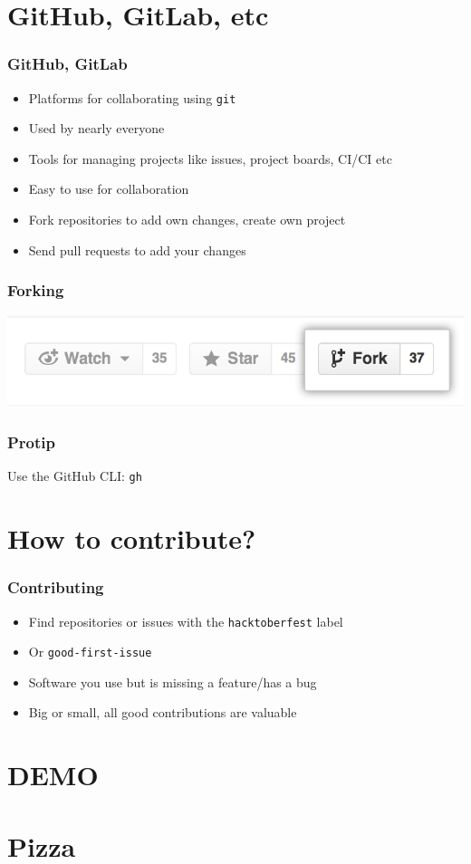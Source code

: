 \documentclass[presentation]{beamer}
\begin{document}
  \section{GitHub, GitLab, etc}
  \begin{frame}
    \frametitle{GitHub, GitLab}
  
    \begin{itemize}
      \item Platforms for collaborating using \texttt{git}
      \item Used by nearly everyone
      \item Tools for managing projects like issues, project boards, CI/CI etc
      \item Easy to use for collaboration
      \item Fork repositories to add own changes, create own project
      \item Send pull requests to add your changes
    \end{itemize}
  \end{frame}
  \begin{frame}
    \frametitle{Forking}
  
    \includegraphics[width=\textwidth]{forking.png}
  \end{frame}
  \begin{frame}[standout]
    \frametitle{Protip}
 
    Use the GitHub CLI: \texttt{gh}
  \end{frame}

  \section{How to contribute?}
  \begin{frame}
    \frametitle{Contributing}
  
    \begin{itemize}
      \item Find repositories or issues with the \texttt{hacktoberfest} label
      \item Or \texttt{good-first-issue}
      \item Software you use but is missing a feature/has a bug
      \item Big or small, all good contributions are valuable
    \end{itemize}
  \end{frame}

  \section{DEMO}
  \section*{Pizza}
\end{document}

